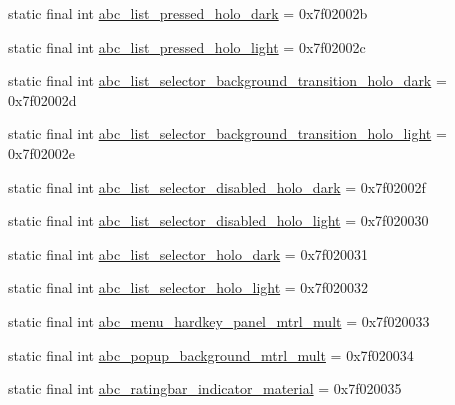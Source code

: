 \begin{CompactItemize}
\item 
static final int \hyperlink{classandroid_1_1support_1_1v7_1_1recyclerview_1_1_r_1_1drawable_a0c0e47acf0b054c72ae59f5f777d5b6}{abc\_\-list\_\-pressed\_\-holo\_\-dark} = 0x7f02002b
\item 
static final int \hyperlink{classandroid_1_1support_1_1v7_1_1recyclerview_1_1_r_1_1drawable_184fd374ef852c28f564f9d67754754f}{abc\_\-list\_\-pressed\_\-holo\_\-light} = 0x7f02002c
\item 
static final int \hyperlink{classandroid_1_1support_1_1v7_1_1recyclerview_1_1_r_1_1drawable_a48a0b3d523e29e3c358527028539715}{abc\_\-list\_\-selector\_\-background\_\-transition\_\-holo\_\-dark} = 0x7f02002d
\item 
static final int \hyperlink{classandroid_1_1support_1_1v7_1_1recyclerview_1_1_r_1_1drawable_60dc6ffa5a09519ae112e62dd8cbbece}{abc\_\-list\_\-selector\_\-background\_\-transition\_\-holo\_\-light} = 0x7f02002e
\item 
static final int \hyperlink{classandroid_1_1support_1_1v7_1_1recyclerview_1_1_r_1_1drawable_89506222790fd5eb86f7d6af6c922445}{abc\_\-list\_\-selector\_\-disabled\_\-holo\_\-dark} = 0x7f02002f
\item 
static final int \hyperlink{classandroid_1_1support_1_1v7_1_1recyclerview_1_1_r_1_1drawable_5fbcbcdbe5eb8b41257632643a9e2279}{abc\_\-list\_\-selector\_\-disabled\_\-holo\_\-light} = 0x7f020030
\item 
static final int \hyperlink{classandroid_1_1support_1_1v7_1_1recyclerview_1_1_r_1_1drawable_d85d9d894b9b56dc6d034019564b3d95}{abc\_\-list\_\-selector\_\-holo\_\-dark} = 0x7f020031
\item 
static final int \hyperlink{classandroid_1_1support_1_1v7_1_1recyclerview_1_1_r_1_1drawable_4794b67039dfb68f0f42af3c7b1e61c2}{abc\_\-list\_\-selector\_\-holo\_\-light} = 0x7f020032
\item 
static final int \hyperlink{classandroid_1_1support_1_1v7_1_1recyclerview_1_1_r_1_1drawable_7cb3b7cb4abee4d5c2360e999646c4bb}{abc\_\-menu\_\-hardkey\_\-panel\_\-mtrl\_\-mult} = 0x7f020033
\item 
static final int \hyperlink{classandroid_1_1support_1_1v7_1_1recyclerview_1_1_r_1_1drawable_44edfe91f252eafe1d4b4ea04cf3794e}{abc\_\-popup\_\-background\_\-mtrl\_\-mult} = 0x7f020034
\item 
static final int \hyperlink{classandroid_1_1support_1_1v7_1_1recyclerview_1_1_r_1_1drawable_e149f7e6d219a7fa0a79d003f5c26d52}{abc\_\-ratingbar\_\-indicator\_\-material} = 0x7f020035
\item 

\end{CompactItemize}
